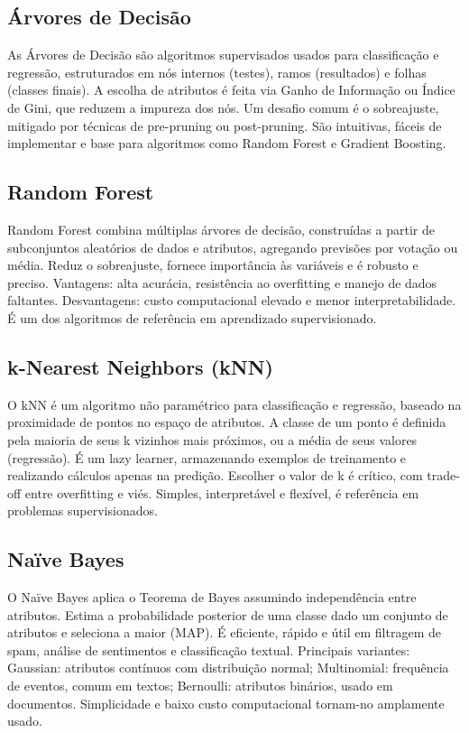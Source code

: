 \documentclass[english, spanish, brazilian]{RBIEarticle} %
\begin{document}
\subsection{Árvores de Decisão}
As Árvores de Decisão são algoritmos supervisados usados para classificação e regressão, estruturados em nós internos (testes), ramos (resultados) e folhas (classes finais). A escolha de atributos é feita via Ganho de Informação ou Índice de Gini, que reduzem a impureza dos nós. Um desafio comum é o sobreajuste, mitigado por técnicas de pre-pruning ou post-pruning. São intuitivas, fáceis de implementar e base para algoritmos como Random Forest e Gradient Boosting.

\subsection{Random Forest}
Random Forest combina múltiplas árvores de decisão, construídas a partir de subconjuntos aleatórios de dados e atributos, agregando previsões por votação ou média. Reduz o sobreajuste, fornece importância às variáveis e é robusto e preciso. Vantagens: alta acurácia, resistência ao overfitting e manejo de dados faltantes. Desvantagens: custo computacional elevado e menor interpretabilidade. É um dos algoritmos de referência em aprendizado supervisionado.

\subsection{k-Nearest Neighbors (kNN)}
O kNN é um algoritmo não paramétrico para classificação e regressão, baseado na proximidade de pontos no espaço de atributos. A classe de um ponto é definida pela maioria de seus k vizinhos mais próximos, ou a média de seus valores (regressão). É um lazy learner, armazenando exemplos de treinamento e realizando cálculos apenas na predição. Escolher o valor de k é crítico, com trade-off entre overfitting e viés. Simples, interpretável e flexível, é referência em problemas supervisionados.

\subsection{Naïve Bayes}
O Naïve Bayes aplica o Teorema de Bayes assumindo independência entre atributos. Estima a probabilidade posterior de uma classe dado um conjunto de atributos e seleciona a maior (MAP). É eficiente, rápido e útil em filtragem de spam, análise de sentimentos e classificação textual. Principais variantes: Gaussian: atributos contínuos com distribuição normal; Multinomial: frequência de eventos, comum em textos; Bernoulli: atributos binários, usado em documentos.
 Simplicidade e baixo custo computacional tornam-no amplamente usado.
\end{document}
